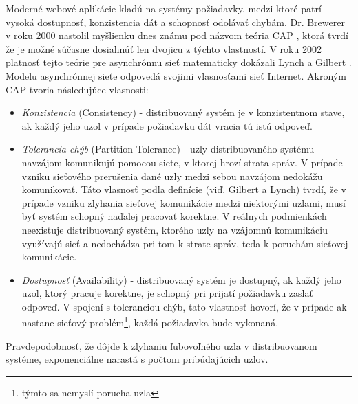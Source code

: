 \documentclass[11pt,twoside,a4paper]{book}
\begin{document}
Moderné webové aplikácie kladú na systémy požiadavky, medzi ktoré patrí vysoká dostupnosť, konzistencia dát a schopnosť odolávať chybám. Dr. Brewerer v roku 2000 nastolil myšlienku dnes známu pod názvom teória CAP \cite{brewer2000towards}, ktorá tvrdí že je možné súčasne dosiahnúť len dvojicu z týchto vlastností. V roku 2002 platnosť tejto teórie pre asynchrónnu sieť matematicky dokázali Lynch a Gilbert \cite{Gilbert:2002:BCF:564585.564601}. Modelu asynchrónnej sieťe odpovedá svojimi vlasnosťami sieť Internet. Akroným CAP tvoria následujúce vlasnosti:
\begin{itemize}
 \item 
  \emph{Konzistencia} (Consistency) - distribuovaný systém je v konzistentnom stave, ak každý jeho uzol v prípade požiadavku dát vracia tú istú odpoveď.

\item
  \emph{Tolerancia chýb} (Partition Tolerance) - uzly distribuovaného systému navzájom komunikujú pomocou siete, v ktorej hrozí strata správ. V prípade vzniku sieťového prerušenia dané uzly medzi sebou navzájom nedokážu komunikovať. Táto vlasnosť podľa definície (viď. Gilbert a Lynch) tvrdí, že v prípade vzniku zlyhania sieťovej komunikácie medzi niektorými uzlami, musí byť systém schopný naďalej pracovať korektne. V reálnych podmienkách neexistuje distribuovaný systém, ktorého uzly na vzájomnú komunikáciu využívajú sieť a nedochádza pri tom k strate správ, teda k poruchám sieťovej komunikácie.

\item
  \emph{Dostupnosť} (Availability) - distribuovaný systém je dostupný, ak každý jeho uzol, ktorý pracuje korektne, je schopný pri prijatí požiadavku zaslať odpoveď. V spojení s toleranciou chýb, tato vlastnosť hovorí, že v prípade ak nastane sieťový problém\footnote{týmto sa nemyslí porucha uzla}, každá požiadavka bude vykonaná.

\end{itemize}

\noindent
Pravdepodobnosť, že dôjde k zlyhaniu ľubovoľného uzla v distribuovanom systéme, exponenciálne narastá s počtom pribúdajúcich uzlov.
\end{document}
